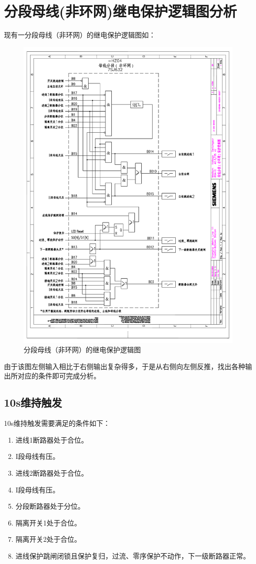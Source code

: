 \chapter{分段母线(非环网)继电保护逻辑图分析}
现有一分段母线（非环网）的继电保护逻辑图如：

\begin{figure}[h]
	\centering
	\includegraphics[width=0.7\linewidth]{figures/分段母线（非环网）的继电保护逻辑图}
	\caption{分段母线（非环网）的继电保护逻辑图}
	\label{fig:分段母线（非环网）的继电保护逻辑图}
\end{figure}

由于该图左侧输入相比于右侧输出复杂得多，于是从右侧向左侧反推，找出各种输出所对应的条件即可完成分析。

\section{10s维持触发}
10s维持触发需要满足的条件如下：

\begin{enumerate}
	\item 进线1断路器处于合位。
	\item I段母线有压。
	\item 进线2断路器处于合位。
	\item I段母线有压。
	\item 分段断路器处于分位。
	\item 隔离开关1处于合位。
	\item 隔离开关2处于合位。
	\item 进线保护跳闸闭锁且保护复归，过流、零序保护不动作，下一级断路器正常。
\end{enumerate}

